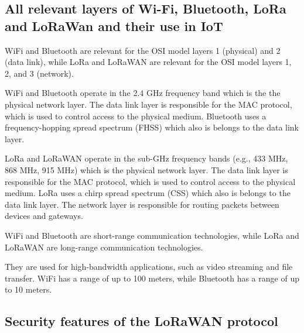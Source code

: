 \subsection{All relevant layers of Wi-Fi, Bluetooth, LoRa and LoRaWan and their use in IoT}

WiFi and Bluetooth are relevant for the OSI model layers 1 (physical) and 2 (data link), while LoRa and LoRaWAN are relevant for the OSI model layers 1, 2, and 3 (network).

WiFi and Bluetooth operate in the 2.4 GHz frequency band which is the the physical network layer. The data link layer is responsible for the MAC protocol, which is used to control access to the physical medium. Bluetooth uses a frequency-hopping spread spectrum (FHSS) which also is belongs to the data link layer\cite{bluetooth_protocol,wifi_osi}.

LoRa and LoRaWAN operate in the sub-GHz frequency bands (e.g., 433 MHz, 868 MHz, 915 MHz) which is the physical network layer. The data link layer is responsible for the MAC protocol, which is used to control access to the physical medium. LoRa uses a chirp spread spectrum (CSS) which also is belongs to the data link layer. The network layer is responsible for routing packets between devices and gateways.

WiFi and Bluetooth are short-range communication technologies, while LoRa and LoRaWAN are long-range communication technologies.

They are used for high-bandwidth applications, such as video streaming and file transfer. WiFi has a range of up to 100 meters, while Bluetooth has a range of up to 10 meters.

\subsection{Security features of the LoRaWAN protocol}


